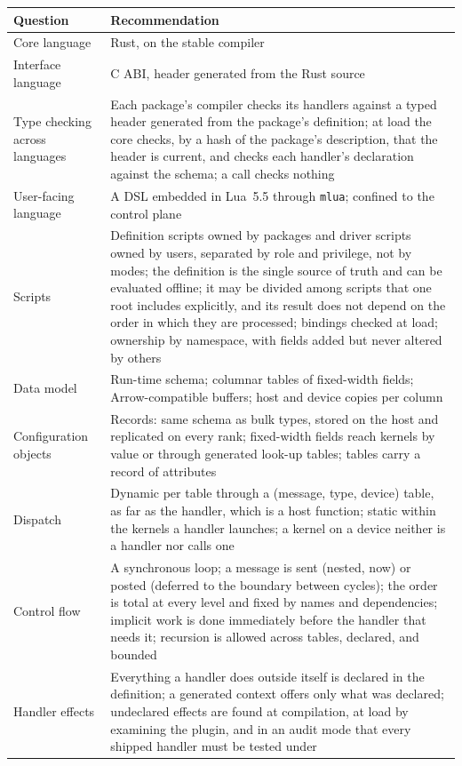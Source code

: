 \documentclass[11pt,a4paper]{article}
\newcommand{\code}[1]{\texttt{#1}}
\begin{document}
{\small
\begin{xltabular}{\textwidth}{@{}>{\raggedright\arraybackslash}p{32mm} L@{}}
\toprule
Question & Recommendation \\
\midrule
\endhead
\bottomrule
\endfoot
Core language & Rust, on the stable compiler \\
Interface language & C ABI, header generated from the Rust source \\
Type checking across languages & Each package's compiler checks its handlers against a typed header generated from the package's definition; at load the core checks, by a hash of the package's description, that the header is current, and checks each handler's declaration against the schema; a call checks nothing \\
User-facing language & A DSL embedded in Lua~5.5 through \code{mlua}; confined to the control plane \\
Scripts & Definition scripts owned by packages and driver scripts owned by users, separated by role and privilege, not by modes; the definition is the single source of truth and can be evaluated offline; it may be divided among scripts that one root includes explicitly, and its result does not depend on the order in which they are processed; bindings checked at load; ownership by namespace, with fields added but never altered by others \\
Data model & Run-time schema; columnar tables of fixed-width fields; Arrow-compatible buffers; host and device copies per column \\
Configuration objects & Records: same schema as bulk types, stored on the host and replicated on every rank; fixed-width fields reach kernels by value or through generated look-up tables; tables carry a record of attributes \\
Dispatch & Dynamic per table through a (message, type, device) table, as far as the handler, which is a host function; static within the kernels a handler launches; a kernel on a device neither is a handler nor calls one \\
Control flow & A synchronous loop; a message is sent (nested, now) or posted (deferred to the boundary between cycles); the order is total at every level and fixed by names and dependencies; implicit work is done immediately before the handler that needs it; recursion is allowed across tables, declared, and bounded \\
Handler effects & Everything a handler does outside itself is declared in the definition; a generated context offers only what was declared; undeclared effects are found at compilation, at load by examining the plugin, and in an audit mode that every shipped handler must be tested under \\

\end{xltabular}}
\end{document}
